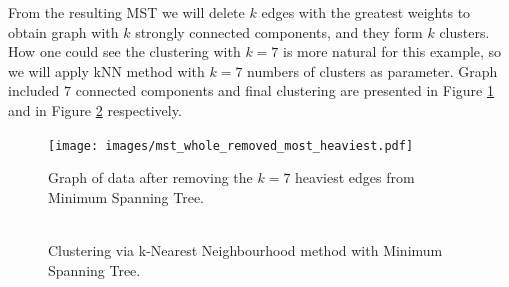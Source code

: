 {	From the resulting MST we will delete $k$ edges with the greatest weights to obtain graph with $k$ strongly connected components, and they form $k$ clusters. How one could see the clustering with $k=7$ is more natural for this example, so we will apply kNN method with $k = 7$ numbers of clusters as parameter. Graph included $7$ connected components and final clustering are presented in Figure \ref{fig:mst_whole_removed_heaviest} and in Figure \ref{fig:mst_clusters_splitted} respectively.

\begin{figure}[h]
	\centering
	\begin{minipage}[h]{0.49\linewidth}
\texttt{[image: images/mst\_whole\_removed\_most\_heaviest.pdf]}
	\end{minipage}
	\caption{Graph of data after removing the $k=7$ heaviest edges from Minimum Spanning Tree.}
	\label{fig:mst_whole_removed_heaviest}	
\end{figure}	

\begin{figure}[h]
	\centering
	\begin{minipage}[h]{0.49\linewidth}
\includegraphics[width=\linewidth]{images/mst_clusters_splitted.pdf}
	\end{minipage}
	\caption{Clustering via k-Nearest Neighbourhood method with Minimum Spanning Tree.}
	\label{fig:mst_clusters_splitted}	
\end{figure}	

}
